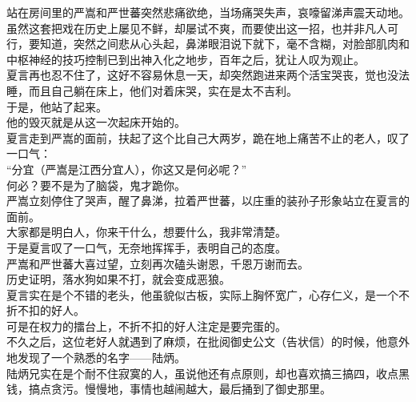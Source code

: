 \begin{multicols}{\theparacolNo}
站在房间里的严嵩和严世蕃突然悲痛欲绝，当场痛哭失声，哀嚎留涕声震天动地。\\

虽然这套把戏在历史上屡见不鲜，却屡试不爽，而要使出这一招，也并非凡人可行，要知道，突然之间悲从心头起，鼻涕眼泪说下就下，毫不含糊，对脸部肌肉和中枢神经的技巧控制已到出神入化之地步，百年之后，犹让人叹为观止。\\

夏言再也忍不住了，这好不容易休息一天，却突然跑进来两个活宝哭丧，觉也没法睡，而且自己躺在床上，他们对着床哭，实在是太不吉利。\\

于是，他站了起来。\\

他的毁灭就是从这一次起床开始的。\\

夏言走到严嵩的面前，扶起了这个比自己大两岁，跪在地上痛苦不止的老人，叹了一口气：\\

“分宜（严嵩是江西分宜人），你这又是何必呢？”\\

何必？要不是为了脑袋，鬼才跪你。\\

严嵩立刻停住了哭声，醒了鼻涕，拉着严世蕃，以庄重的装孙子形象站立在夏言的面前。\\

大家都是明白人，你来干什么，想要什么，我非常清楚。\\

于是夏言叹了一口气，无奈地挥挥手，表明自己的态度。\\

严嵩和严世蕃大喜过望，立刻再次磕头谢恩，千恩万谢而去。\\

历史证明，落水狗如果不打，就会变成恶狼。\\

夏言实在是个不错的老头，他虽貌似古板，实际上胸怀宽广，心存仁义，是一个不折不扣的好人。\\

可是在权力的擂台上，不折不扣的好人注定是要完蛋的。\\

不久之后，这位老好人就遇到了麻烦，在批阅御史公文（告状信）的时候，他意外地发现了一个熟悉的名字——陆炳。\\

陆炳兄实在是个耐不住寂寞的人，虽说他还有点原则，却也喜欢搞三搞四，收点黑钱，搞点贪污。慢慢地，事情也越闹越大，最后捅到了御史那里。\\


\end{multicols}
